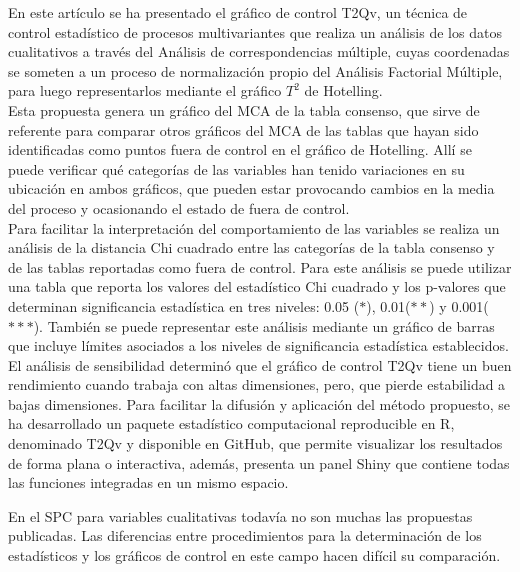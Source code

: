 \documentclass[water,article,submit,moreauthors,pdftex]{mdpi}
\begin{document}
En este artículo se ha presentado el gráfico de control T2Qv, un técnica
de control estadístico de procesos multivariantes que realiza un
análisis de los datos cualitativos a través del Análisis de
correspondencias múltiple, cuyas coordenadas se someten a un proceso de
normalización propio del Análisis Factorial Múltiple, para luego
representarlos mediante el gráfico \(T^2\) de Hotelling.\\
Esta propuesta genera un gráfico del MCA de la tabla consenso, que sirve
de referente para comparar otros gráficos del MCA de las tablas que
hayan sido identificadas como puntos fuera de control en el gráfico de
Hotelling. Allí se puede verificar qué categorías de las variables han
tenido variaciones en su ubicación en ambos gráficos, que pueden estar
provocando cambios en la media del proceso y ocasionando el estado de
fuera de control.\\
Para facilitar la interpretación del comportamiento de las variables se
realiza un análisis de la distancia Chi cuadrado entre las categorías de
la tabla consenso y de las tablas reportadas como fuera de control. Para
este análisis se puede utilizar una tabla que reporta los valores del
estadístico Chi cuadrado y los p-valores que determinan significancia
estadística en tres niveles: 0.05 (\(*\)), 0.01(\(**\)) y
0.001(\(***\)). También se puede representar este análisis mediante un
gráfico de barras que incluye límites asociados a los niveles de
significancia estadística establecidos.\\
El análisis de sensibilidad determinó que el gráfico de control T2Qv
tiene un buen rendimiento cuando trabaja con altas dimensiones, pero,
que pierde estabilidad a bajas dimensiones. Para facilitar la difusión y
aplicación del método propuesto, se ha desarrollado un paquete
estadístico computacional reproducible en R, denominado T2Qv y
disponible en GitHub, que permite visualizar los resultados de forma
plana o interactiva, además, presenta un panel Shiny que contiene todas
las funciones integradas en un mismo espacio.

En el SPC para variables cualitativas todavía no son muchas las
propuestas publicadas. Las diferencias entre procedimientos para la
determinación de los estadísticos y los gráficos de control en este
campo hacen difícil su comparación.

%
\end{document}

